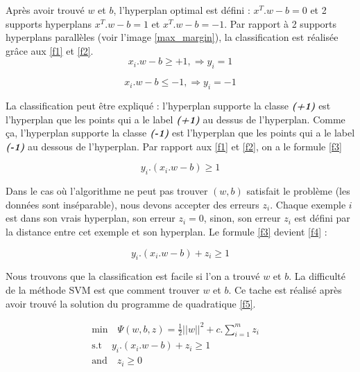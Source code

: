 Après avoir trouvé $w$ et $b$, l'hyperplan optimal est défini : $x^T.w - b = 0$ et 2 supports hyperplans $x^T.w - b = 1$ et $x^T.w - b = -1$. Par rapport à 2 supports hyperplans parallèles (voir l'image \ref{max_margin}), la classification est réalisée grâce aux \ref{f1} et \ref{f2}.
\begin{equation}
x_i.w - b \geq +1, \Rightarrow y_i = 1
\label{f1}
\end{equation}

\begin{equation}
x_i.w - b \leq -1, \Rightarrow y_i = -1
\label{f2}
\end{equation}

La classification peut être expliqué : l'hyperplan supporte la classe \textit{\textbf{(+1)}} est l'hyperplan que les points qui a le label \textit{\textbf{(+1)}} au dessus de l'hyperplan. Comme ça, l'hyperplan supporte la classe \textit{\textbf{(-1)}} est l'hyperplan que les points qui a le label \textit{\textbf{(-1)}} au dessous de l'hyperplan. Par rapport aux \ref{f1} et \ref{f2}, on a le formule \ref{f3}

\begin{equation}
y_i.(x_i.w - b) \geq 1
\label{f3}
\end{equation}

Dans le cas où l'algorithme ne peut pas trouver $(w, b)$ satisfait le problème (les données sont inséparable), nous devons accepter des erreurs $z_i$. Chaque exemple $i$ est dans son vrais hyperplan, son erreur $z_i = 0$, sinon, son erreur $z_i$ est défini par la distance entre cet exemple et son hyperplan. Le formule \ref{f3} devient \ref{f4} :

\begin{equation}
y_i.(x_i.w - b) + z_i \geq 1
\label{f4}
\end{equation}

Nous trouvons que la classification est facile si l'on a trouvé $w$ et $b$. La difficulté de la méthode SVM est que comment trouver $w$ et $b$. Ce tache est réalisé après avoir trouvé la solution du programme de quadratique \ref{f5}.

\begin{equation}
\begin{split}
\mbox{min}\quad \Psi(w, b, z) = \frac{1}{2} ||w||^2 + c.\sum\limits_{i=1}^m z_i\quad \\ \mbox{s.t} \quad y_i.(x_i.w - b) + z_i \geq 1 \\ \mbox{and} \quad z_i \geq 0
\end{split}
\label{f5}
\end{equation}

